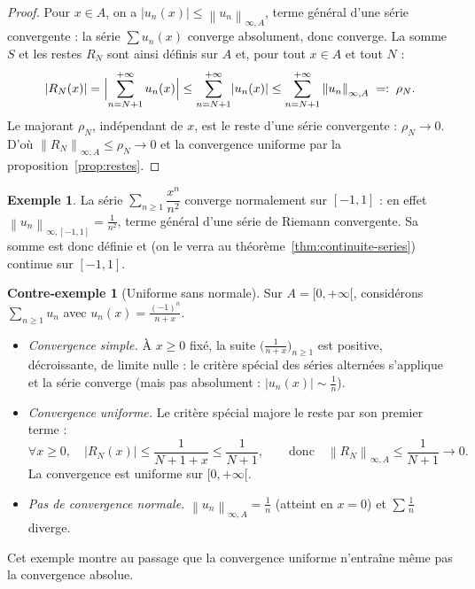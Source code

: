 \documentclass[11pt,a4paper]{article}
\theoremstyle{plain}
\theoremstyle{definition}
\newtheorem{exemple}[theoreme]{Exemple}
\newtheorem{contrex}[theoreme]{Contre-exemple}
\theoremstyle{remark}
\newcommand{\Ninf}[2]{\left\lVert #1 \right\rVert_{\infty,#2}}
\numberwithin{equation}{section}
\begin{document}
\begin{proof}
Pour $x\in A$, on a $\lvert u_n(x)\rvert \leq \Ninf{u_n}{A}$, terme
général d'une série convergente : la série $\sum u_n(x)$ converge
absolument, donc converge. La somme $S$ et les restes $R_N$ sont ainsi
définis sur $A$ et, pour tout $x\in A$ et tout $N$ :
\[
    \lvert R_N(x)\rvert
    = \Bigl\lvert \sum_{n=N+1}^{+\infty} u_n(x) \Bigr\rvert
    \leq \sum_{n=N+1}^{+\infty} \lvert u_n(x)\rvert
    \leq \sum_{n=N+1}^{+\infty} \Ninf{u_n}{A} \;=:\; \rho_N .
\]
Le majorant $\rho_N$, indépendant de $x$, est le reste d'une série
convergente : $\rho_N\to 0$. D'où $\Ninf{R_N}{A}\leq\rho_N\to 0$ et la
convergence uniforme par la proposition~\ref{prop:restes}.
\end{proof}

\begin{exemple}
La série $\sum_{n\geq 1} \dfrac{x^n}{n^2}$ converge normalement sur
$[-1,1]$ : en effet $\Ninf{u_n}{[-1,1]} = \frac{1}{n^2}$, terme général
d'une série de Riemann convergente. Sa somme est donc définie et (on le
verra au théorème~\ref{thm:continuite-series}) continue sur $[-1,1]$.
\end{exemple}

\begin{contrex}[Uniforme sans normale]\label{cex:alternee}
Sur $A=[0,+\infty[$, considérons $\displaystyle\sum_{n\geq 1} u_n$ avec
$u_n(x) = \frac{(-1)^n}{n+x}$.
\begin{itemize}
    \item \emph{Convergence simple.} À $x\geq 0$ fixé, la suite
    $\bigl(\frac{1}{n+x}\bigr)_{n\geq 1}$ est positive, décroissante, de
    limite nulle : le critère spécial des séries alternées s'applique et
    la série converge (mais pas absolument :
    $\lvert u_n(x)\rvert \sim \frac1n$).
    \item \emph{Convergence uniforme.} Le critère spécial majore le reste
    par son premier terme :
    \[
        \forall x\geq 0,\quad
        \lvert R_N(x)\rvert \leq \frac{1}{N+1+x} \leq \frac{1}{N+1},
        \qquad\text{donc}\quad \Ninf{R_N}{A}\leq\frac{1}{N+1}\to 0 .
    \]
    La convergence est uniforme sur $[0,+\infty[$.
    \item \emph{Pas de convergence normale.} $\Ninf{u_n}{A} = \frac1n$
    (atteint en $x=0$) et $\sum\frac1n$ diverge.
\end{itemize}
Cet exemple montre au passage que la convergence uniforme n'entraîne même
pas la convergence absolue.
\end{contrex}
\end{document}
